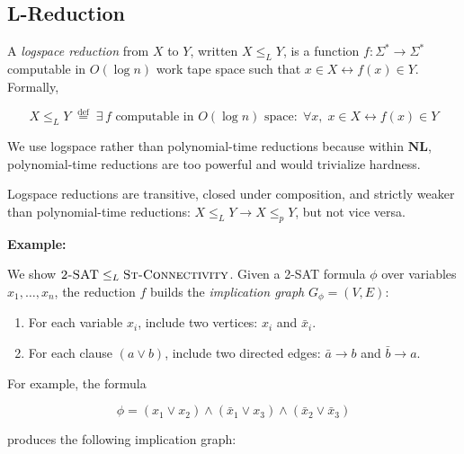 \documentclass[12pt,a4paper,openany]{article}
\begin{document}
\subsection{L-Reduction}

A \emph{logspace reduction} from $X$ to $Y$, written $X \leq_L Y$, is a function
$f: \Sigma^* \to \Sigma^*$ computable in $O(\log n)$ work tape space such that
$x \in X \leftrightarrow f(x) \in Y$. Formally, 

\[
X \leq_L Y \;\stackrel{\text{def}}{=}\; \exists\, f \text{ computable in } O(\log n) \text{ space}:\; \forall x,\; x \in X \leftrightarrow f(x) \in Y
\]

We use logspace rather than polynomial-time reductions because within $\mathbf{NL}$,
polynomial-time reductions are too powerful and would trivialize hardness.

Logspace reductions are transitive, closed under composition, and strictly weaker
than polynomial-time reductions: $X \leq_L Y \to X \leq_p Y$, but not vice versa.

\textbf{Example: }

We show $\textsc{2-SAT} \leq_L \textsc{St-Connectivity}$. Given a 2-SAT formula $\phi$ over variables $x_1, \ldots, x_n$, the reduction $f$ builds the \emph{implication graph} $G_\phi = (V, E)$:

\begin{enumerate}
    \item For each variable $x_i$, include two vertices: $x_i$ and $\bar{x}_i$.
    \item For each clause $(a \vee b)$, include two directed edges: $\bar{a} \to b$ and $\bar{b} \to a$.
\end{enumerate}

For example, the formula

\[
\phi = (x_1 \vee x_2) \wedge (\bar{x}_1 \vee x_3) \wedge (\bar{x}_2 \vee \bar{x}_3)
\]

produces the following implication graph:

\begin{center}
\end{center}
\end{document}
